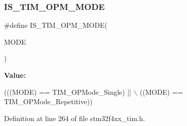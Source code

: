 \subsubsection{\texorpdfstring{I\+S\+\_\+\+T\+I\+M\+\_\+\+O\+P\+M\+\_\+\+M\+O\+DE}{IS\_TIM\_OPM\_MODE}}
{\footnotesize\ttfamily \#define I\+S\+\_\+\+T\+I\+M\+\_\+\+O\+P\+M\+\_\+\+M\+O\+DE(\begin{DoxyParamCaption}\item[{}]{M\+O\+DE }\end{DoxyParamCaption})}

{\bfseries Value\+:}
\begin{DoxyCode}
(((MODE) == TIM\_OPMode\_Single) || \(\backslash\)
                               ((MODE) == TIM\_OPMode\_Repetitive))
\end{DoxyCode}


Definition at line 264 of file stm32f4xx\+\_\+tim.\+h.

